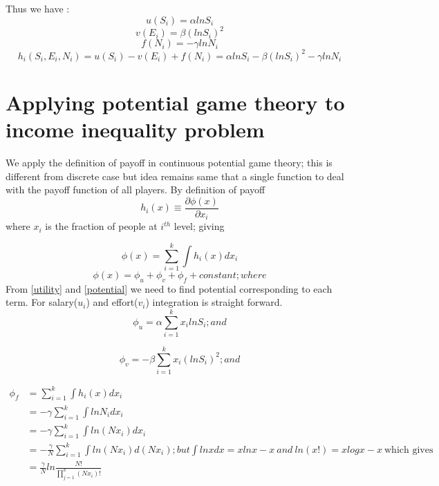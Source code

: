 \documentclass[letterpaper,english,10pt]{article}
\begin{document}
Thus we have :
\begin{equation}
    u(S_i) = \alpha ln S_i
\end{equation}
\begin{equation}
    v(E_i) = \beta (ln S_i)^2
\end{equation}
\begin{equation}
f(N_i) = - \gamma ln N_i
\end{equation}
\begin{equation}\label{utility}
 h_i(S_i,E_i,N_i) = u(S_i) - v(E_i) + f(N_i)= \alpha ln S_i - \beta (ln S_i)^2 - \gamma ln N_i
 \end{equation}
\section{Applying potential game theory to income inequality problem}
\begin{defn}
	We apply the definition of payoff in continuous potential game theory; this is different from discrete case but idea remains same that a single function to deal with the payoff function of all players. By definition of payoff
	\begin{equation}
	h_i(x) \equiv  \frac{\partial\phi(x)}{\partial x_i} 
	\end{equation}
	where $x_i$ is the fraction of people at $i^{th}$ level; giving
\end{defn}

\begin{equation} \label{potential}
    \phi(x) = \sum_{i=1}^{k}\int{}{}h_i(x)dx_i
\end{equation}
\begin{equation}
    \phi(x) = \phi_u + \phi_v + \phi_f + constant ; where
\end{equation}
From \ref{utility} and \ref{potential} we need to find potential corresponding to each term. For salary($u_i$) and effort($v_i$) integration is straight forward.
\begin{equation}
    \phi_u = \alpha \sum_{i=1}^{k}x_i lnS_i ;and
\end{equation}

\begin{equation}
    \phi_v = -\beta \sum_{i=1}^{k} x_i(ln S_i)^2 ; and
\end{equation}

\begin{align}
  \phi_f &= \sum_{i=1}^{k}\int{}{}h_i(x)dx_i \\
         &= - \gamma \sum_{i=1}^{k}\int{}{}ln N_i dx_i \\
         &= -\gamma \sum_{i=1}^{k}\int{}{} ln (Nx_i) dx_i \\
         &=-\frac{\gamma}{N} \sum_{i=1}^{k}\int{}{} ln (Nx_i) d(Nx_i); but \int{}{} lnxdx = xlnx -x ~ and ~ln(x!) = xlogx -x ~ \text{which gives}\\
         &=\frac{\gamma}{N} ln\frac{N!}{\prod_{j=1}^{k}(Nx_i)!}   
\end{align}
\end{document}
